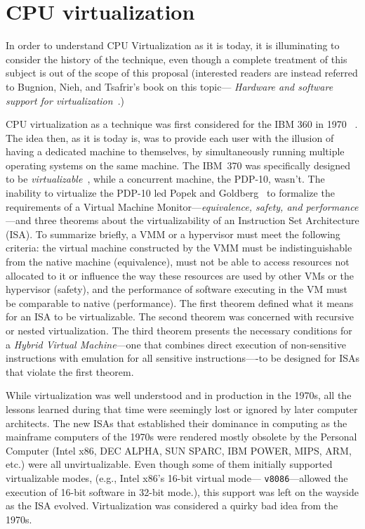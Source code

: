 \chapter{CPU virtualization}
\label{sec:cpuvirt}
In order to understand CPU Virtualization as it is today, it is illuminating
to consider the history of the technique, even though a complete treatment of
this subject is out of the scope of this proposal (interested readers are
instead referred to Bugnion, Nieh, and Tsafrir's book on this topic---\emph{
Hardware and software support for virtualization}~\cite{bugnion-nieh-tsafrir}.)

CPU virtualization as a technique was first considered for the IBM 360 in 1970~
\cite{meyer-virtual-machines}. The idea then, as it is today is, was to provide
each user with the illusion of having a dedicated machine to themselves, by
simultaneously running multiple operating systems on the same machine.
The IBM~370 was specifically designed to be \emph{virtualizable}~\cite{vm370},
while a concurrent machine, the PDP-10, wasn't. The inability to virtualize
the PDP-10 led Popek and Goldberg~\cite{popek-goldberg} to formalize the
requirements of a Virtual Machine Monitor---\emph{equivalence, safety, and
performance}---and three theorems about the virtualizability of an Instruction
Set Architecture (ISA). To summarize briefly, a VMM or a hypervisor must meet
the following criteria:
the virtual machine constructed by the VMM must be indistinguishable from the
native machine (equivalence), must not be able to access resources not
allocated to it or influence the way these resources are used by other VMs or
the hypervisor (safety), and the performance of software executing in the VM
must be comparable to native (performance).
The first theorem defined what it means for an ISA to be virtualizable.
The second theorem was concerned with recursive or nested virtualization.
The third theorem presents the necessary conditions for a \emph{Hybrid Virtual
Machine}---one that combines direct execution of non-sensitive instructions
with emulation for all sensitive instructions----to be designed for ISAs that
violate the first theorem.

While virtualization was well understood and in production in the 1970s, all
the lessons learned during that time were seemingly lost or ignored by later
computer architects. The new ISAs that established their dominance in
computing as the mainframe computers of the 1970s were rendered mostly
obsolete by the Personal Computer (Intel x86, DEC ALPHA, SUN SPARC, IBM POWER,
MIPS, ARM, etc.) were all unvirtualizable. Even though some of them initially
supported virtualizable modes, (e.g., Intel x86's 16-bit virtual mode---
\texttt{v8086}---allowed the execution of 16-bit software in 32-bit mode.),
this support was left on the wayside as the ISA evolved. Virtualization was
considered a quirky bad idea from the 1970s.

